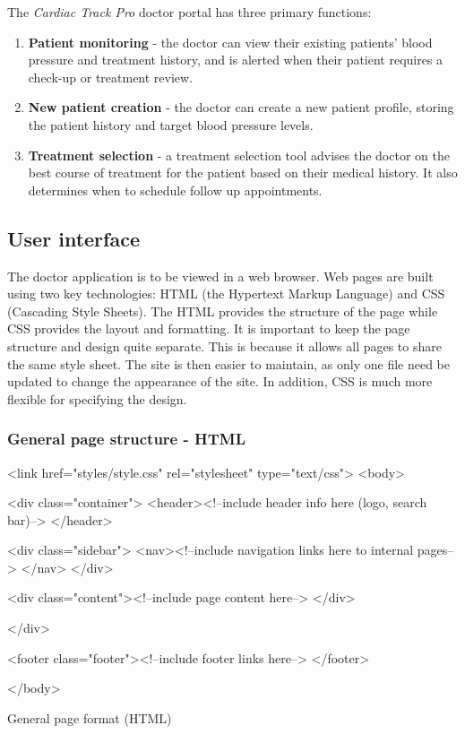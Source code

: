 \documentclass[11pt]{article}
\begin{document}
The \textit{Cardiac Track Pro} doctor portal has three primary functions:
\begin{enumerate}
\item \textbf{Patient monitoring} - the doctor can view their existing patients' blood pressure and treatment history, and is alerted when their patient requires a check-up or treatment review.
\item \textbf{New patient creation} - the doctor can create a new patient profile, storing the patient history and target blood pressure levels.
\item \textbf{Treatment selection} - a treatment selection tool advises the doctor on the best course of treatment for the patient based on their medical history. It also determines when to schedule follow up appointments.
\end{enumerate}

\subsection{User interface}

The doctor application is to be viewed in a web browser. Web pages are built using two key technologies: HTML (the Hypertext Markup Language) and CSS (Cascading Style Sheets). The HTML provides the structure of the page while CSS provides the layout and formatting. It is important to keep the page structure and design quite separate. This is because it allows all pages to share the same style sheet. The site is then easier to maintain, as only one file need be updated to change the appearance of the site.  In addition, CSS is much more flexible for specifying the design.

\subsubsection{General page structure - HTML}


\begin{code}[ht]
\begin{html}
<link href="styles/style.css" rel="stylesheet" type="text/css">
<body>

<div class="container">
  	<header><!--include header info here (logo, search bar)-->
    </header>
    
    <div class="sidebar">
    <nav><!--include navigation links here to internal pages-->
    </nav>
    </div>

    <div class="content"><!--include page content here-->
    </div>
  	
</div>

<footer class="footer"><!--include footer links here-->
	</footer>

</body>
\end{html}
\caption{General page format (HTML)}
\label{code:htmlGeneral}
\end{code}
\end{document}
